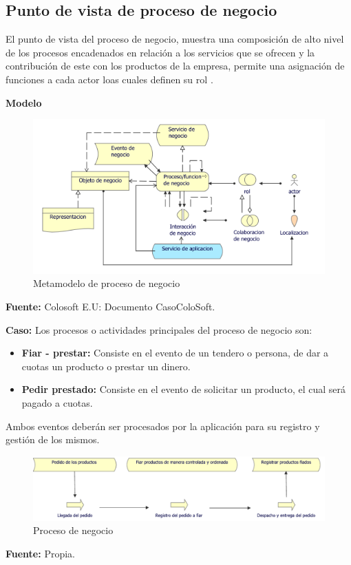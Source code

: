 	\subsection{Punto de vista de proceso de negocio}
	{ El punto de vista del proceso de negocio, muestra una composición de alto nivel de los procesos encadenados en relación a los servicios que se ofrecen y la contribución de este con los productos de la empresa, permite una asignación de funciones a cada actor loas cuales definen su rol \cite{archimate}.\\
	\newpage
		
		\textbf{Modelo}\\
		\begin{figure}[H]
			\centering
			\includegraphics[width=0.8\linewidth]{development/proceso.png}
			\caption{Metamodelo de proceso de negocio}
		\end{figure}
		\begin{center}
			\textbf{Fuente:} Colosoft E.U: Documento CasoColoSoft.
		\end{center}
		\hfill \break
		
		\textbf{Caso:} Los procesos o actividades principales del proceso de negocio son:
		
		\begin{itemize}
			\item \textbf{Fiar - prestar:} Consiste en el evento de un tendero o persona, de dar a cuotas un producto o prestar un dinero.
			
			\item \textbf{Pedir prestado:} Consiste en el evento de solicitar un producto, el cual será pagado a cuotas.
			
		\end{itemize}
		
		Ambos eventos deberán ser procesados por la aplicación para su registro y gestión de los mismos.
		
		
		\begin{figure}[H]
			\centering
			\includegraphics[width=0.8\linewidth]{development/proceso.pdf}
			\caption{Proceso de negocio}
		\end{figure}
		\begin{center}
			\textbf{Fuente:} Propia.
		\end{center}
	}
	
